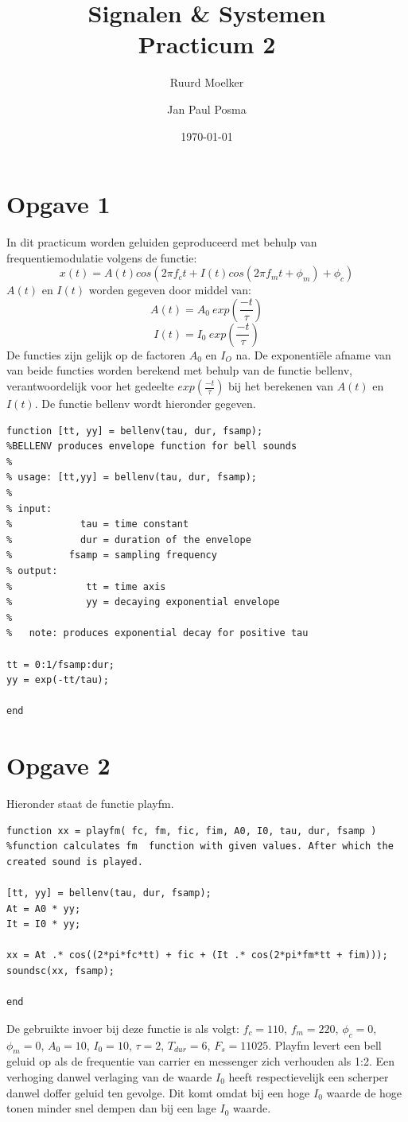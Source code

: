 \documentclass{article}
\author{Ruurd Moelker \and Jan Paul Posma}
\date{\today}
\title{Signalen \& Systemen \\Practicum 2}
\begin{document}
\maketitle
 
\section{Opgave 1}
In dit practicum worden geluiden geproduceerd met behulp van frequentiemodulatie volgens de functie:
$$x(t) = A(t)cos(2 \pi f_c t + I(t)cos(2 \pi f_m t + \phi_m) + \phi_c)$$
$A(t)$ en $I(t)$ worden gegeven door middel van:
$$A(t) = A_0~exp(\frac{-t}{\tau})$$
$$I(t) = I_0~exp(\frac{-t}{\tau})$$
De functies zijn gelijk op de factoren $A_0$ en $I_O$ na. De  exponenti\"ele afname van van beide functies worden berekend met behulp van de functie bellenv, verantwoordelijk voor het gedeelte $exp(\frac{-t}{\tau})$ bij het berekenen van $A(t)$ en $I(t)$. De functie bellenv wordt hieronder gegeven.

\begin{lstlisting}
function [tt, yy] = bellenv(tau, dur, fsamp);
%BELLENV produces envelope function for bell sounds
%
% usage: [tt,yy] = bellenv(tau, dur, fsamp);
%
% input:
%            tau = time constant
%            dur = duration of the envelope
%          fsamp = sampling frequency
% output:
%             tt = time axis
%             yy = decaying exponential envelope
%
%   note: produces exponential decay for positive tau

tt = 0:1/fsamp:dur;
yy = exp(-tt/tau);

end
\end{lstlisting}

\section{Opgave 2}
Hieronder staat de functie playfm. 

\begin{lstlisting}
function xx = playfm( fc, fm, fic, fim, A0, I0, tau, dur, fsamp )
%function calculates fm  function with given values. After which the created sound is played.

[tt, yy] = bellenv(tau, dur, fsamp);
At = A0 * yy;
It = I0 * yy;

xx = At .* cos((2*pi*fc*tt) + fic + (It .* cos(2*pi*fm*tt + fim)));
soundsc(xx, fsamp);

end
\end{lstlisting}

De gebruikte invoer bij deze functie is als volgt: $f_c = 110$, $f_m = 220$, $\phi_c = 0$, $\phi_m = 0$, $A_0 = 10$, $I_0 = 10$, $\tau = 2$, $T_{dur} = 6$, $F_s = 11025$. Playfm levert een bell geluid op als de frequentie van carrier en messenger zich verhouden als 1:2. Een verhoging danwel verlaging van de waarde $I_0$ heeft respectievelijk een scherper danwel doffer geluid ten gevolge. Dit komt omdat bij een hoge $I_0$ waarde de hoge tonen minder snel dempen dan bij een lage $I_0$ waarde.
\end{document}
